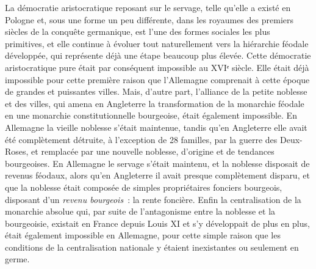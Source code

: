 \documentclass[french,twoside]{book} %
\begin{document}
La démocratie aristocratique reposant sur le servage, telle qu’elle a existé en Pologne et, sous une forme un peu différente, dans les royaumes des premiers siècles de la conquête germanique, est l’une des formes sociales les plus primitives, et elle continue à évoluer tout naturellement vers la hiérarchie féodale développée, qui représente déjà une étape beaucoup plus élevée. Cette démocratie aristocratique pure était par conséquent impossible au XVIᵉ siècle. Elle était déjà impossible pour cette première raison que l’Allemagne comprenait à cette époque de grandes et puissantes villes. Mais, d’autre part, l’alliance de la petite noblesse et des villes, qui amena en Angleterre la transformation de la monarchie féodale en une monarchie constitutionnelle bourgeoise, était également impossible. En Allemagne la vieille noblesse s’était maintenue, tandis qu’en Angleterre elle avait été complètement détruite, à l’exception de 28 familles, par la guerre des Deux-Roses, et remplacée par une nouvelle noblesse, d’origine et de tendances bourgeoises. En Allemagne le servage s’était maintenu, et la noblesse disposait de revenus féodaux, alors qu’en Angleterre il avait presque complètement disparu, et que la noblesse était composée de simples propriétaires fonciers bourgeois, disposant d’un \emph{revenu bourgeois} : la rente foncière. Enfin la centralisation de la monarchie absolue qui, par suite de l’antagonisme entre la noblesse et la bourgeoisie, existait en France depuis Louis XI et s’y développait de plus en plus, était également impossible en Allemagne, pour cette simple raison que les conditions de la centralisation nationale y étaient inexistantes ou seulement en germe.\par
\end{document}
